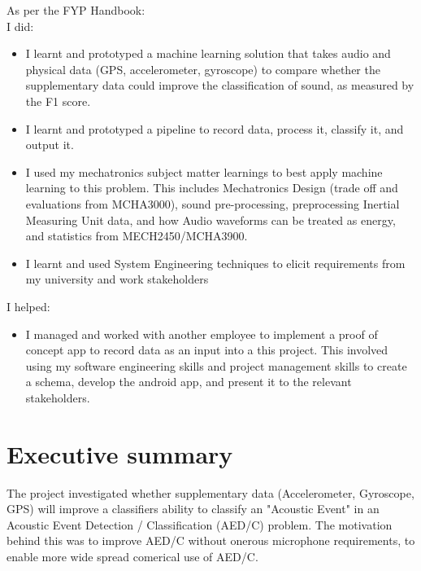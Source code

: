 \documentclass{UoNMCHA}
\numberwithin{equation}{section}
\begin{document}
As per the FYP Handbook: \\
I did:
\begin{itemize}
    \item I learnt and prototyped a machine learning solution that takes audio and physical data (GPS, accelerometer, gyroscope) to compare whether the supplementary data could improve the classification of sound, as measured by the F1 score.
    \item I learnt and prototyped a pipeline to record data, process it, classify it, and output it.
    \item I used my mechatronics subject matter learnings to best apply machine learning to this problem. This includes Mechatronics Design (trade off and evaluations from MCHA3000), sound pre-processing, preprocessing Inertial Measuring Unit data, and how Audio waveforms can be treated as energy, and statistics from MECH2450/MCHA3900.
    \item I learnt and used System Engineering techniques to elicit requirements from my university and work stakeholders
\end{itemize}
I helped:
\begin{itemize}
   \item I managed and worked with another employee to implement a proof of concept app to record data as an input into a this project. This involved using my software engineering skills and project management skills to create a schema, develop the android app, and present it to the relevant stakeholders.
\end{itemize}
\newpage

\vspace{-5mm}
\section*{Executive summary}
\vspace{-3mm}
The project investigated whether supplementary data (Accelerometer, Gyroscope, GPS) will improve a classifiers ability to classify an "Acoustic Event" in an Acoustic Event Detection / Classification (AED/C) problem. The motivation behind this was to improve AED/C without onerous microphone requirements, to enable more wide spread comerical use of AED/C. \\
\end{document}
